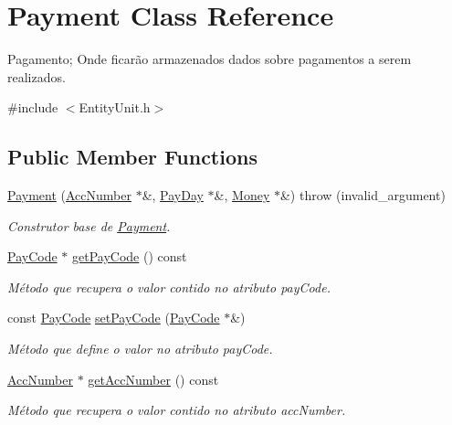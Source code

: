 \hypertarget{classPayment}{\section{Payment Class Reference}
\label{d5/d5e/classPayment}
}


Pagamento; Onde ficarão armazenados dados sobre pagamentos a serem realizados.  




{\ttfamily \#include $<$Entity\-Unit.\-h$>$}

\subsection*{Public Member Functions}
\begin{DoxyCompactItemize}
\item 
\hyperlink{classPayment_ab39bbaa53eb3f58106d8f40e2f0b8a0f}{Payment} (\hyperlink{classAccNumber}{Acc\-Number} $\ast$\&, \hyperlink{classPayDay}{Pay\-Day} $\ast$\&, \hyperlink{classMoney}{Money} $\ast$\&)  throw (invalid\-\_\-argument)
\begin{DoxyCompactList}\small\item\em Construtor base de \hyperlink{classPayment}{Payment}. \end{DoxyCompactList}\item 
\hyperlink{classPayCode}{Pay\-Code} $\ast$ \hyperlink{classPayment_ad8f162a6ae938095d78ec969a8f18a65}{get\-Pay\-Code} () const 
\begin{DoxyCompactList}\small\item\em Método que recupera o valor contido no atributo pay\-Code. \end{DoxyCompactList}\item 
const \hyperlink{classPayCode}{Pay\-Code} \hyperlink{classPayment_a30c735ed3046ed79d6d683d137857215}{set\-Pay\-Code} (\hyperlink{classPayCode}{Pay\-Code} $\ast$\&)
\begin{DoxyCompactList}\small\item\em Método que define o valor no atributo pay\-Code. \end{DoxyCompactList}\item 
\hyperlink{classAccNumber}{Acc\-Number} $\ast$ \hyperlink{classPayment_a890339672666de9bdce1a165b9fb6caa}{get\-Acc\-Number} () const 
\begin{DoxyCompactList}\small\item\em Método que recupera o valor contido no atributo acc\-Number. \end{DoxyCompactList}\item 

\end{DoxyCompactItemize}
